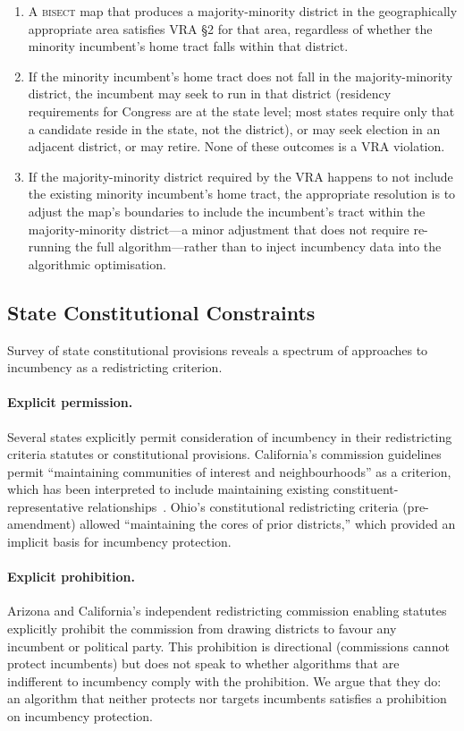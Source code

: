 \begin{enumerate}
  \item A \textsc{bisect} map that produces a majority-minority district in the
    geographically appropriate area satisfies VRA \S{}2 for that area, regardless
    of whether the minority incumbent's home tract falls within that district.
  \item If the minority incumbent's home tract does not fall in the majority-minority
    district, the incumbent may seek to run in that district (residency requirements
    for Congress are at the state level; most states require only that a candidate
    reside in the state, not the district), or may seek election in an adjacent
    district, or may retire. None of these outcomes is a VRA violation.
  \item If the majority-minority district required by the VRA happens to not include
    the existing minority incumbent's home tract, the appropriate resolution is to
    adjust the map's boundaries to include the incumbent's tract within the
    majority-minority district---a minor adjustment that does not require re-running the
    full algorithm---rather than to inject incumbency data into the algorithmic
    optimisation.
\end{enumerate}

\subsection{State Constitutional Constraints}

Survey of state constitutional provisions reveals a spectrum of approaches to incumbency
as a redistricting criterion.

\paragraph{Explicit permission.}
Several states explicitly permit consideration of incumbency in their redistricting
criteria statutes or constitutional provisions. California's commission guidelines
permit ``maintaining communities of interest and neighbourhoods'' as a criterion,
which has been interpreted to include maintaining existing constituent-representative
relationships~\citep{ncsl2021criteria}. Ohio's constitutional redistricting criteria
(pre-amendment) allowed ``maintaining the cores of prior districts,'' which provided
an implicit basis for incumbency protection.

\paragraph{Explicit prohibition.}
Arizona and California's independent redistricting commission enabling statutes
explicitly prohibit the commission from drawing districts to favour any incumbent or
political party. This prohibition is directional (commissions cannot protect incumbents)
but does not speak to whether algorithms that are indifferent to incumbency comply
with the prohibition. We argue that they do: an algorithm that neither protects nor
targets incumbents satisfies a prohibition on incumbency protection.

